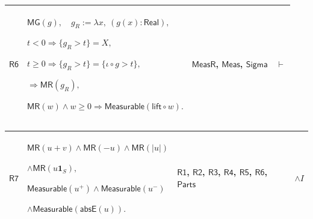 \documentclass[11pt]{amsart}
\newlength{\FTCFourColumnBody}
\begin{document}
{\begin{tabular}
\end{tabular}%
\par\setlength{\parskip}{0pt}\nointerlineskip
\noindent
\begin{tabular}{|@{}>{\centering\arraybackslash}m{0.078431\FTCFourColumnBody}|>{\centering\arraybackslash}m{0.535947\FTCFourColumnBody}|>{\centering\arraybackslash}m{0.281045\FTCFourColumnBody}|>{\centering\arraybackslash}m{0.104575\FTCFourColumnBody}|}\hline
\hypertarget{dct:R6}{$\displaystyle \textsf{R6}$} & $\displaystyle \textsf{MG}(g),\quad g_R:=\lambda x,\ (g(x):\textsf{Real}),$\par
$\displaystyle t<0\Rightarrow\{g_R>t\}=X,$\par
$\displaystyle t\ge0\Rightarrow\{g_R>t\}=\{\iota\circ g>t\},$\par
$\displaystyle \Rightarrow\textsf{MR}(g_R),$\par
$\displaystyle \textsf{MR}(w)\land w\ge0\Rightarrow\textsf{Measurable}(\textsf{lift}\circ w).$ & \hyperlink{dctdef:MeasR}{$\displaystyle \textsf{MeasR}$}, \hyperlink{def:Meas}{$\displaystyle \textsf{Meas}$}, \hyperlink{ax:Sigma}{$\displaystyle \textsf{Sigma}$} & $\displaystyle \vdash$\\ \hline
\end{tabular}%
\par\setlength{\parskip}{0pt}\nointerlineskip
\noindent
\begin{tabular}{|@{}>{\centering\arraybackslash}m{0.078431\FTCFourColumnBody}|>{\centering\arraybackslash}m{0.535947\FTCFourColumnBody}|>{\centering\arraybackslash}m{0.281045\FTCFourColumnBody}|>{\centering\arraybackslash}m{0.104575\FTCFourColumnBody}|}\hline
\hypertarget{dct:R7}{$\displaystyle \textsf{R7}$} & $\displaystyle \textsf{MR}(u+v)\land\textsf{MR}(-u)\land\textsf{MR}(|u|)$\par
$\displaystyle \land\textsf{MR}(u\mathbf1_S),$\par
$\displaystyle \textsf{Measurable}(u^+)\land\textsf{Measurable}(u^-)$\par
$\displaystyle \land\textsf{Measurable}(\textsf{absE}(u)).$ & \hyperlink{dct:R1}{$\displaystyle \textsf{R1}$}, \hyperlink{dct:R2}{$\displaystyle \textsf{R2}$}, \hyperlink{dct:R3}{$\displaystyle \textsf{R3}$}, \hyperlink{dct:R4}{$\displaystyle \textsf{R4}$}, \hyperlink{dct:R5}{$\displaystyle \textsf{R5}$}, \hyperlink{dct:R6}{$\displaystyle \textsf{R6}$}, \hyperlink{dctdef:Parts}{$\displaystyle \textsf{Parts}$} & $\displaystyle \land I$\\ \hline
\end{tabular}%
\par
}
\end{document}
